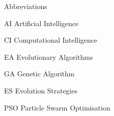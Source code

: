 
\begin{dictionary}{Abbreviations}
\item[AI]	Artificial Intelligence
\item[CI]	Computational Intelligence
\item[EA]	Evolutionary Algorithms
\item[GA]	Genetic Algorithm
\item[ES]	Evolution Strategies
\item[PSO]	Particle Swarm Optimisation
\end{dictionary}
